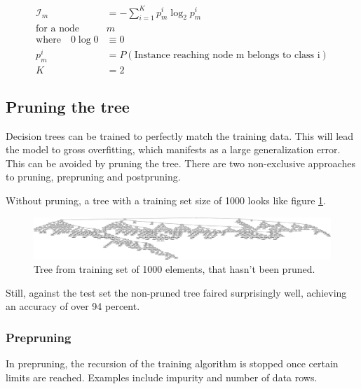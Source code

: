 \documentclass[a4paper,10pt]{article}
\begin{document}
\begin{equation*}
\begin{split}
\mathcal{I}_m &= - \sum_{i=1}^K p_m^i \log_2 p_m^i  \\
\text{for a node} \quad & m  \\
\text{where} \quad 0 \log 0 &\equiv 0  \\
p_m^i &= P(\text{Instance reaching node m belongs to class i})  \\
K &= 2
\end{split}
\end{equation*}

\subsection{Pruning the tree}

Decision trees can be trained to perfectly match the training
data\cite[p. 182]{alpaydin2004}.  This will lead the model to
gross overfitting, which manifests as a large generalization error.
This can be avoided by pruning the tree.  There are two non-exclusive
approaches to pruning, prepruning and postpruning.

Without pruning, a tree with a training set size of 1000 looks like
figure \ref{fig:no-pruning-1000}.

\begin{figure}[h]
  \centering
  \begin{minipage}[c]{1.0\textwidth}
    \centering
\includegraphics[width=130mm]{no-pruning-1000.png}
  \end{minipage}
  \caption{Tree from training set of 1000 elements, that hasn't been
    pruned.}
  \label{fig:no-pruning-1000}
\end{figure}

Still, against the test set the non-pruned tree faired surprisingly
well, achieving an accuracy of over 94 percent.

\subsubsection{Prepruning}

In prepruning, the recursion of the training algorithm is stopped once
certain limits are reached.  Examples include impurity and number of
data rows.
\end{document}
